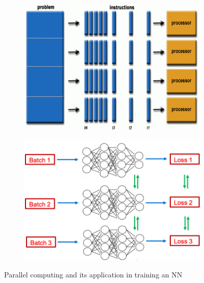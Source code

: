 \begin{figure}[!h]
        \begin{center}
	\begin{subfigure}{0.35\linewidth}
		\centering
		\includegraphics[width=\linewidth]{figs/parallel1.png}
	\end{subfigure}
	\begin{subfigure}{0.35\linewidth}
		\centering
		\includegraphics[width=\linewidth]{figs/parallel2.png}
	\end{subfigure}
	\caption{Parallel computing and its application in training an NN}
	\label{fig: parallel}
        \end{center}
\end{figure}